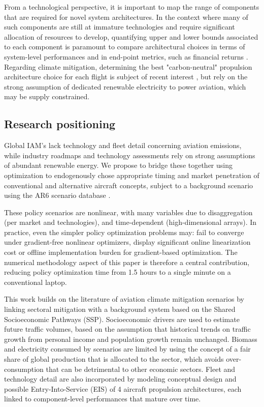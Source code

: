 \documentclass[a4paper,fleqn]{cas-dc}
\begin{document}
From a technological perspective, it is important to map the range of components that are required for novel system architectures. In the context where many of such components are still at immature technologies and require significant allocation of resources to develop, quantifying upper and lower bounds associated to each component is paramount to compare architectural choices in terms of system-level performances \cite{kirby_forecasting_1999} and in end-point metrics, such as financial returns \cite{de_weck_technology_2022}. Regarding climate mitigation, determining the best "carbon-neutral" propulsion architecture choice for each flight is subject of recent interest \cite{adler_energy_2025}, but rely on the strong assumption of dedicated renewable electricity to power aviation, which may be supply constrained.

\subsection{Research positioning}

Global IAM's lack technology and fleet detail concerning aviation emissions, while industry roadmaps and technology assessments rely on strong assumptions of abundant renewable energy. We propose to bridge these together using optimization to endogenously chose appropriate timing and market penetration of conventional and alternative aircraft concepts, subject to a background scenario using the AR6 scenario database \cite{ar6_database}.

These policy scenarios are nonlinear, with many variables due to disaggregation (per market and technologies), and time-dependent (high-dimensional arrays). In practice, even the simpler policy optimization problems may: fail to converge under gradient-free nonlinear optimizers, display significant online linearization cost or offline implementation burden for gradient-based optimization. The numerical methodology aspect of this paper is therefore a central contribution, reducing policy optimization time from 1.5 hours to a single minute on a conventional laptop.

This work builds on the literature of aviation climate mitigation scenarios by linking sectoral mitigation with a background system based on the Shared Socioeconomic Pathways (SSP). Socioeconomic drivers are used to estimate future traffic volumes, based on the assumption that historical trends on traffic growth from personal income and population growth remain unchanged. Biomass and electricity consumed by scenarios are limited by using the concept of a fair share of global production that is allocated to the sector, which avoids over-consumption that can be detrimental to other economic sectors. Fleet and technology detail are also incorporated by modeling conceptual design and possible Entry-Into-Service (EIS) of 4 aircraft propulsion architectures, each linked to component-level performances that mature over time.
\end{document}

